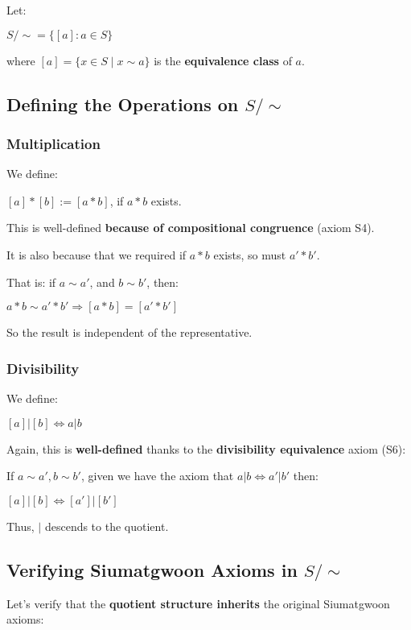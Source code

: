 Let:

$S/\sim=\{[a]:a\in S\}$

where $[a]=\{x\in S\mid x\sim a\}$ is the \textbf{equivalence class} of $a$.

\subsection{Defining the Operations on $S/\sim$}

\subsubsection{Multiplication}

We define:

$[a]*[b]:=[a*b]$, if $a*b$ exists.

This is well-defined \textbf{because of compositional congruence} (axiom S4).

It is also because that we required if $a*b$ exists, so must $a'*b'$.

That is: if $a \sim a'$, and $b \sim b'$, then:

$a*b\sim a'*b'\Rightarrow [a*b]=[a'*b']$

So the result is independent of the representative.

\subsubsection{Divisibility}

We define:

$[a]|[b] \iff a|b$

Again, this is \textbf{well-defined} thanks to the \textbf{divisibility equivalence} axiom (S6):

If $a\sim a', b \sim b'$, given we have the axiom that $a|b \iff a'|b'$ then:

$[a]|[b] \iff [a']|[b']$

Thus, $|$ descends to the quotient.

\subsection{Verifying Siumatgwoon Axioms in $S/\sim$}

Let's verify that the \textbf{quotient structure inherits} the original Siumatgwoon axioms:

